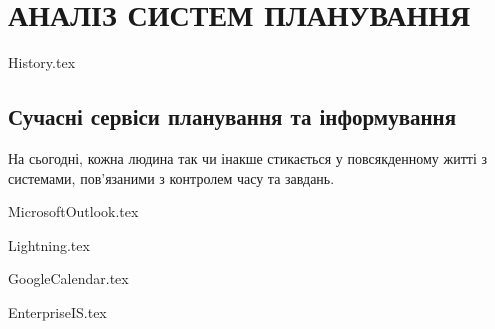\section{АНАЛІЗ СИСТЕМ ПЛАНУВАННЯ}

{History.tex}

\subsection{Сучасні сервіси планування та інформування}

На сьогодні, кожна людина так чи інакше стикається у повсякденному житті з системами, пов'язаними з контролем часу та завдань.

{MicrosoftOutlook.tex}

{Lightning.tex}

{GoogleCalendar.tex}

{EnterpriseIS.tex}
